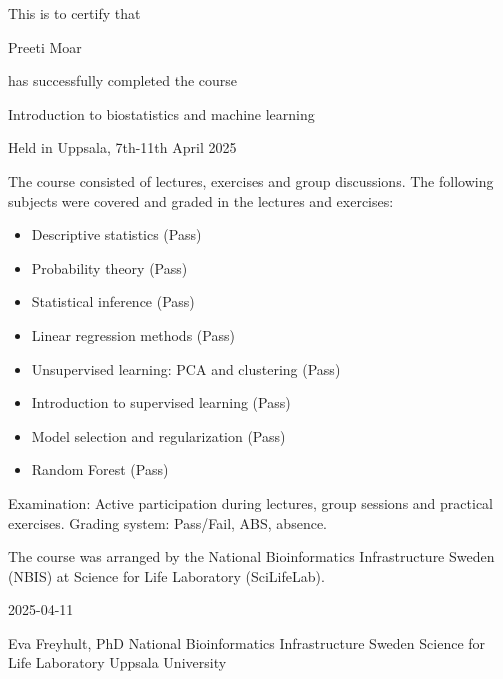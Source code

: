 \documentclass[12pt]{article}\usepackage[]{graphicx}\usepackage[]{color}
\newcommand{\courseName}{Introduction to biostatistics and machine learning}
\newcommand{\courseLocation}{in Uppsala}
\newcommand{\courseDate}{7th-11th April 2025}
\newcommand{\courseLastDay}{2025-04-11}
\newcommand{\courseExaminer}{Eva Freyhult, PhD}
\begin{document}
\large
This is to certify that 


\LARGE
Preeti Moar

\large
has successfully completed the course \newline

\LARGE
\begin{center}{\courseName}  \end{center} 


\large
\begin{center} Held  {\courseLocation}, {\courseDate} \end{center} 

\vspace{5mm}
\normalsize
The course consisted of lectures, exercises and group discussions. The following subjects were covered and graded  in the lectures and exercises:
\begin{itemize}
  \item Descriptive statistics (Pass)
  \item Probability theory (Pass)
  \item Statistical inference (Pass)
  \item Linear regression methods (Pass)
  \item Unsupervised learning: PCA and clustering (Pass)
  \item Introduction to supervised learning (Pass)
  \item Model selection and regularization (Pass)
  \item Random Forest (Pass)
\end{itemize}


\vspace{5mm}
Examination: \newline
Active participation during lectures, group sessions and practical exercises. Grading system: Pass/Fail, ABS, absence. 

\vspace{8mm}
The course was arranged by the National Bioinformatics Infrastructure Sweden (NBIS) at Science for Life Laboratory (SciLifeLab).


\vspace{8mm}
 {\courseLastDay}
\vspace{22mm}


{\courseExaminer} \newline
\small
National Bioinformatics Infrastructure Sweden \newline
Science for Life Laboratory \newline
Uppsala University \newline
\end{document}
